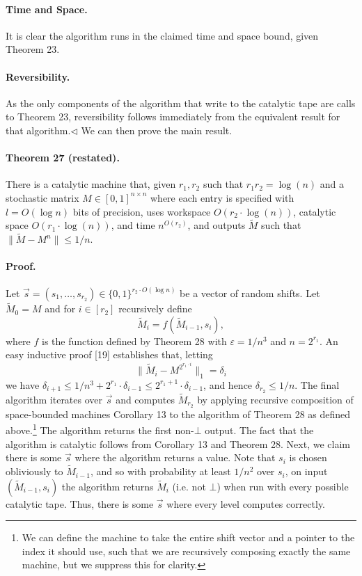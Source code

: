 \documentclass[10pt,a4paper]{article}
\begin{document}
\paragraph{Time and Space.} It is clear the algorithm runs in the claimed time and space bound, given Theorem 23.
\paragraph{Reversibility.} As the only components of the algorithm that write to the catalytic tape are calls to Theorem 23, reversibility follows immediately from the equivalent result for that algorithm.\hfill$\triangleleft$
We can then prove the main result.
\paragraph{Theorem 27 (restated).} There is a catalytic machine that, given $r_1,r_2$ such that $r_1r_2=\log(n)$ and a stochastic matrix $M\in[0,1]^{n\times n}$ where each entry is specified with $l=O(\log n)$ bits of precision, uses workspace $O(r_2\cdot\log(n))$, catalytic space $O(r_1\cdot\log(n))$, and time $n^{O(r_2)}$, and outputs $\widetilde M$ such that $\|\widetilde M-M^n\|\leq1/n$.
\paragraph{Proof.} Let $\vec s=(s_1,\ldots,s_{r_2})\in\{0,1\}^{r_2\cdot O(\log n)}$ be a vector of random shifts. Let $\widetilde M_0=M$ and for $i\in[r_2]$ recursively define
\[\widetilde M_i=f(\widetilde M_{i-1},s_i),\]
where $f$ is the function defined by Theorem 28 with $\varepsilon=1/n^3$ and $n=2^{r_1}$. An easy inductive proof [19] establishes that, letting
\[\|\widetilde M_i-M^{2^{r_1\cdot i}}\|_1=\delta_i\]
we have $\delta_{i+1}\leq1/n^3+2^{r_1}\cdot\delta_{i-1}\leq2^{r_1+1}\cdot\delta_{i-1}$, and hence $\delta_{r_2}\leq1/n$.
The final algorithm iterates over $\vec s$ and computes $\widetilde M_{r_2}$ by applying recursive composition of space-bounded machines Corollary 13 to the algorithm of Theorem 28 as defined above.\footnote{We can define the machine to take the entire shift vector and a pointer to the index it should use, such that we are recursively composing exactly the same machine, but we suppress this for clarity.} The algorithm returns the first non-$\bot$ output. The fact that the algorithm is catalytic follows from Corollary 13 and Theorem 28. Next, we claim there is some $\vec s$ where the algorithm returns a value. Note that $s_i$ is chosen obliviously to $\widetilde M_{i-1}$, and so with probability at least $1/n^2$ over $s_i$, on input $(\widetilde M_{i-1},s_i)$ the algorithm returns $\widetilde M_i$ (i.e. not $\bot$) when run with every possible catalytic tape. Thus, there is some $\vec s$ where every level computes correctly.
\end{document}
